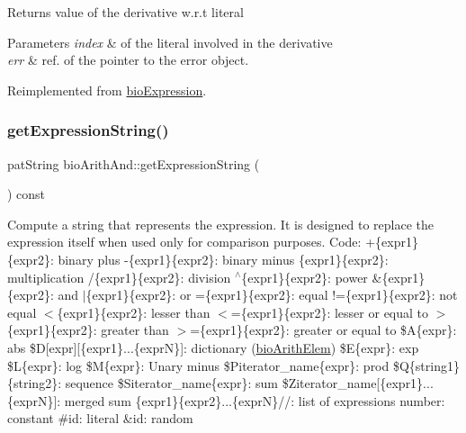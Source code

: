 \begin{DoxyReturn}{Returns}
value of the derivative w.\+r.\+t literal 
\end{DoxyReturn}

\begin{DoxyParams}{Parameters}
{\em index} & of the literal involved in the derivative \\
\hline
{\em err} & ref. of the pointer to the error object. \\
\hline
\end{DoxyParams}


Reimplemented from \hyperlink{classbio_expression_a5915579d1193f25f216c1e273c97f2ce}{bio\+Expression}.

\mbox{\label{classbio_arith_and_a9b21342d9f2f1bc59bbab1596b60ed48}} 
\subsubsection{\texorpdfstring{get\+Expression\+String()}{getExpressionString()}}
{\footnotesize\ttfamily pat\+String bio\+Arith\+And\+::get\+Expression\+String (\begin{DoxyParamCaption}{ }\end{DoxyParamCaption}) const\hspace{0.3cm}{\ttfamily [virtual]}}

Compute a string that represents the expression. It is designed to replace the expression itself when used only for comparison purposes. Code\+: +\{expr1\}\{expr2\}\+: binary plus -\/\{expr1\}\{expr2\}\+: binary minus \{expr1\}\{expr2\}\+: multiplication /\{expr1\}\{expr2\}\+: division $^\wedge$\{expr1\}\{expr2\}\+: power \&\{expr1\}\{expr2\}\+: and $\vert$\{expr1\}\{expr2\}\+: or =\{expr1\}\{expr2\}\+: equal !=\{expr1\}\{expr2\}\+: not equal $<$\{expr1\}\{expr2\}\+: lesser than $<$=\{expr1\}\{expr2\}\+: lesser or equal to $>$\{expr1\}\{expr2\}\+: greater than $>$=\{expr1\}\{expr2\}\+: greater or equal to \$A\{expr\}\+: abs \$D\mbox{[}expr\mbox{]}\mbox{[}\{expr1\}...\{exprN\}\mbox{]}\+: dictionary (\hyperlink{classbio_arith_elem}{bio\+Arith\+Elem}) \$E\{expr\}\+: exp \$L\{expr\}\+: log \$M\{expr\}\+: Unary minus \$\+Piterator\+\_\+name\{expr\}\+: prod \$Q\{string1\}\{string2\}\+: sequence \$\+Siterator\+\_\+name\{expr\}\+: sum \$\+Ziterator\+\_\+name\mbox{[}\{expr1\}...\{exprN\}\mbox{]}\+: merged sum \{expr1\}\{expr2\}...\{exprN\}//\+: list of expressions number\+: constant \#id\+: literal \&id\+: random 

